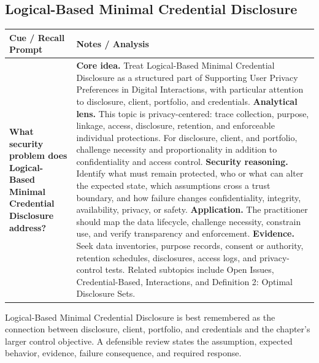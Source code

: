 \documentclass[11pt]{article}
\newcommand{\CornellHeader}{%
\rowcolor{Navy}\color{white}\bfseries Cue / Recall Prompt & \color{white}\bfseries Notes / Analysis\\\hline}
\newcommand{\CornellRow}[2]{%
\cellcolor{CueGray}\RaggedRight\textbf{#1} & \RaggedRight #2\\\hline}
\begin{document}
\subsection*{Logical-Based Minimal Credential Disclosure}
\begin{longtable}{>{\RaggedRight\arraybackslash}p{}|>{\RaggedRight\arraybackslash}p{}}
\CornellHeader
\CornellRow{What security problem does Logical-Based Minimal Credential Disclosure address?}{\textbf{Core idea.} Treat Logical-Based Minimal Credential Disclosure as a structured part of Supporting User Privacy Preferences in Digital Interactions, with particular attention to disclosure, client, portfolio, and credentials. \textbf{Analytical lens.} This topic is privacy-centered: trace collection, purpose, linkage, access, disclosure, retention, and enforceable individual protections. For disclosure, client, and portfolio, challenge necessity and proportionality in addition to confidentiality and access control. \textbf{Security reasoning.} Identify what must remain protected, who or what can alter the expected state, which assumptions cross a trust boundary, and how failure changes confidentiality, integrity, availability, privacy, or safety. \textbf{Application.} The practitioner should map the data lifecycle, challenge necessity, constrain use, and verify transparency and enforcement. \textbf{Evidence.} Seek data inventories, purpose records, consent or authority, retention schedules, disclosures, access logs, and privacy-control tests. Related subtopics include Open Issues, Credential-Based, Interactions, and Definition 2: Optimal Disclosure Sets.}
\end{longtable}
\begin{topicsummary}
Logical-Based Minimal Credential Disclosure is best remembered as the connection between disclosure, client, portfolio, and credentials and the chapter's larger control objective. A defensible review states the assumption, expected behavior, evidence, failure consequence, and required response.
\end{topicsummary}
\end{document}
